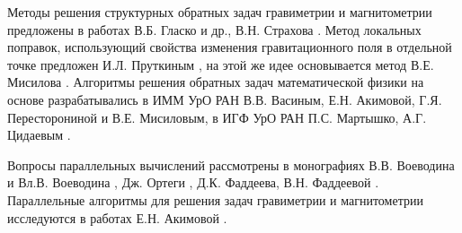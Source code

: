 {Методы решения структурных обратных задач гравиметрии и магнитометрии предложены в работах В.Б. Гласко и др.\cite{GlaOstFil1970}, В.Н. Страхова \cite{Str1967,Str1969,Str1974_1,Str1974_2,Str1976}. Метод локальных поправок, использующий свойства изменения гравитационного поля в отдельной точке предложен И.Л. Пруткиным \cite{Pru1983,Pru1986,Prutdiss1998}, на этой же идее основывается метод В.Е. Мисилова \cite{Mis2014,Mis2015}. Алгоритмы решения обратных задач математической физики на основе разрабатывались в ИММ УрО РАН В.В. Васиным, Е.Н. Акимовой, Г.Я. Пересторониной и В.Е. Мисиловым, в ИГФ УрО РАН П.С. Мартышко, А.Г. Цидаевым \cite{MarPru1982,MarTsi2008}.

Вопросы параллельных вычислений рассмотрены в монографиях В.В. Воеводина и Вл.В. Воеводина \cite{VoeVoe2002}, Дж. Ортеги \cite{Ort1991}, Д.К. Фаддеева, В.Н. Фаддеевой \cite{FadFad1977}.
Параллельные алгоритмы для решения задач
гравиметрии и магнитометрии исследуются в работах Е.Н. Акимовой \cite{Aki1994,Aki2009,Akidiss2009,AkiBel2011,AkiMisKos2015}.
}



